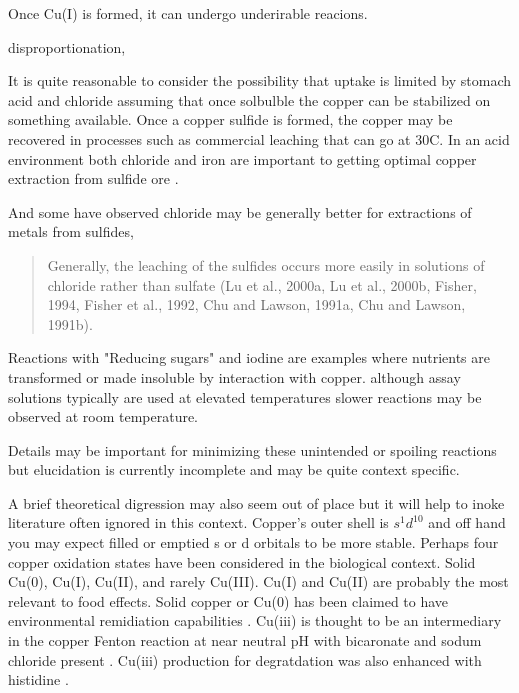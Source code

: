 


Once Cu(I) is formed, it can undergo underirable reacions.

\cite{SAMUNI_ARONOVITCH_GODINGER_cytotoxicity_1983}


disproportionation,




It is quite reasonable to consider the possibility that
uptake is limited by stomach acid and chloride assuming
that once solbulble the copper can be stabilized on something
available. 
Once a copper sulfide is formed, the copper may be recovered
in processes such as commercial leaching that can go at
30C. In an acid environment both chloride and iron 
are important to getting optimal copper extraction from 
sulfide ore 
\cite{Salinas_Herreros_Torres_Leaching_Primary_Copper_2018}.

And some have observed chloride may be generally better
for extractions of metals from sulfides, 
\cite{Herreros_Vinals_Leaching_sulfide_copper_2007}
\begin{quote}
Generally, the leaching of the sulfides occurs more easily in solutions of chloride rather than sulfate (Lu et al., 2000a, Lu et al., 2000b, Fisher, 1994, Fisher et al., 1992, Chu and Lawson, 1991a, Chu and Lawson, 1991b). 
\end{quote}






Reactions with "Reducing sugars"
and iodine are examples where nutrients are transformed
or made insoluble by interaction with copper. although
assay solutions typically are used at elevated temperatures
slower reactions may be observed at room temperature.

Details may be important for minimizing these unintended
or spoiling reactions but elucidation is currently incomplete
and may be quite context specific. 


A brief theoretical digression may also seem out of place
but it will help to inoke literature often ignored in this
context. 
Copper's outer shell is $s^1d^{10}$
and off hand you may expect filled or emptied s or d orbitals
to be more stable. 
Perhaps four copper oxidation states have been 
considered in the biological context. Solid Cu(0),
Cu(I), Cu(II), and rarely Cu(III). Cu(I) and Cu(II)
are probably the most relevant to food effects. 
Solid copper or Cu(0) has been claimed to have
environmental remidiation capabilities
\cite{deSousa2019}.
Cu(iii) is thought to be an intermediary in the
copper Fenton reaction at near neutral pH with
bicaronate and sodum chloride present
\cite{Pham_Xing_Miller_Fenton_like_copper_redox_2013}.
Cu(iii) production for degratdation was also enhanced
with histidine
\cite{Park_Lee_Kim_Trivalent_Copper_Mediated_2024}.

